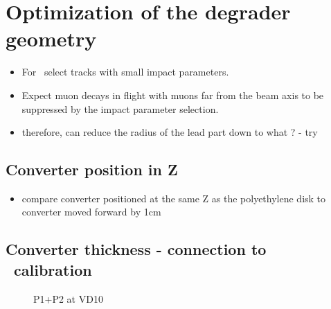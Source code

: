 \section{Optimization of the degrader geometry}

\begin{itemize}
\item 
  For \piplusenu\ select tracks with small impact parameters.
\item 
  Expect muon decays in flight with muons far from the beam axis to be suppressed
  by the impact parameter selection.
\item
  therefore, can reduce the radius of the lead part down to what ? - try 
\end{itemize}

\subsection{Converter position in Z}

\begin{itemize}
\item
  compare converter positioned at the same Z as the polyethylene disk
  to converter moved forward by 1cm 
\end{itemize}

\subsection{Converter thickness - connection to \piplusenu\  calibration}

\begin{figure}[H]
  \caption{
    \label{figure:sum_mom_vd10}
    P1+P2 at VD10
  }
\end{figure}

